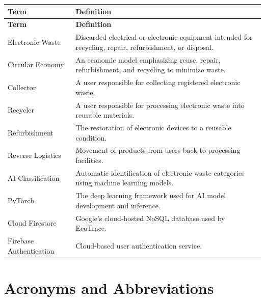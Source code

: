 \begin{longtable}{|p{4cm}|p{10cm}|}

\hline
\textbf{Term} &
\textbf{Definition} \\
\hline
\endfirsthead

\hline
\textbf{Term} &
\textbf{Definition} \\
\hline
\endhead

Electronic Waste &
Discarded electrical or electronic equipment intended for recycling,
repair, refurbishment, or disposal. \\
\hline

Circular Economy &
An economic model emphasizing reuse, repair, refurbishment, and
recycling to minimize waste. \\
\hline

Collector &
A user responsible for collecting registered electronic waste. \\
\hline

Recycler &
A user responsible for processing electronic waste into reusable
materials. \\
\hline

Refurbishment &
The restoration of electronic devices to a reusable condition. \\
\hline

Reverse Logistics &
Movement of products from users back to processing facilities. \\
\hline

AI Classification &
Automatic identification of electronic waste categories using machine
learning models. \\
\hline

PyTorch &
The deep learning framework used for AI model development and
inference. \\
\hline

Cloud Firestore &
Google's cloud-hosted NoSQL database used by EcoTrace. \\
\hline

Firebase Authentication &
Cloud-based user authentication service. \\
\hline

\end{longtable}

\section{Acronyms and Abbreviations}


